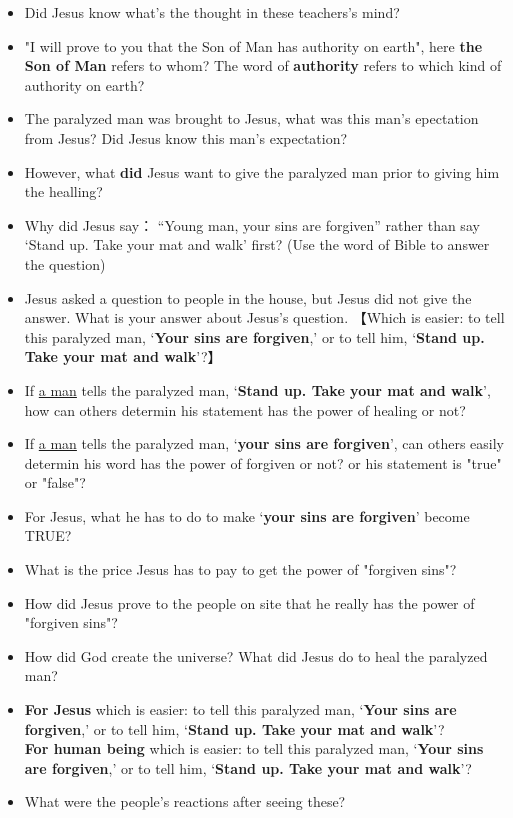\begin{itemize}[noitemsep]
\item Did Jesus know what's the thought in these teachers's mind?
\item "I will prove to you that the Son of Man has authority on earth", here \textbf{the Son of Man} refers to whom? The word of \textbf{authority} refers to which kind of authority on earth?
\item The paralyzed man was brought to Jesus, what was this man's epectation from Jesus? Did Jesus know this man's expectation?
\item However, what \textbf{did} Jesus want to give the paralyzed man prior to giving him the healling?
\item Why did Jesus say： “Young man, your sins are forgiven” rather than say ‘Stand up. Take your mat and walk’ first? (Use the word of Bible to answer the question)
\item Jesus asked a question to people in the house, but Jesus did not give the answer. What is your answer about Jesus's question. 【Which is easier: to tell this paralyzed man, ‘\textbf{Your sins are forgiven},’ or to tell him, ‘\textbf{Stand up. Take your mat and walk}’?】
\item If \underline{a man} tells the paralyzed man, ‘\textbf{Stand up. Take your mat and walk}’, how can others determin his statement has the power of healing or not?
\item If \underline{a man} tells the paralyzed man, ‘\textbf{your sins are forgiven}’, can others easily determin his word has the power of forgiven or not? or his statement is "true" or "false"?
\item For Jesus, what he has to do to make ‘\textbf{your sins are forgiven}’ become TRUE?
\item What is the price Jesus has to pay to get the power of "forgiven sins"?
\item How did Jesus prove to the people on site that he really has the power of  "forgiven sins"?
\item How did God create the universe? What did Jesus do to heal the paralyzed man?
\item \textbf{For Jesus} which is easier: to tell this paralyzed man, ‘\textbf{Your sins are forgiven},’ or to tell him, ‘\textbf{Stand up. Take your mat and walk}’?\\
\textbf{For human being} which is easier: to tell this paralyzed man, ‘\textbf{Your sins are forgiven},’ or to tell him, ‘\textbf{Stand up. Take your mat and walk}’?
\item What were the people's reactions after seeing these?
\end{itemize}














